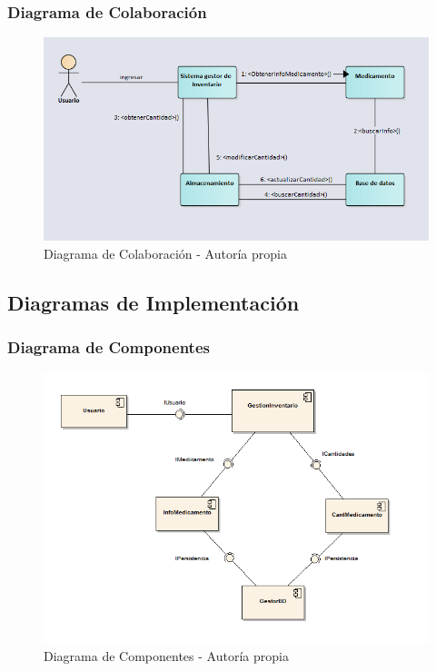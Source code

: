 \newpage


\subsubsection{ Diagrama de Colaboración}
\begin{center}
    \begin{figure}[htb]
        \centering
        \includegraphics[width = 1.2\linewidth] {libro/capitulo5/img/Colaboracion.PNG}
        \caption{Diagrama de Colaboración - Autor\'ia propia}
        \label{fig:my_label}
    \end{figure}
\end{center}
\newpage

\subsection{ Diagramas de Implementación}
\subsubsection{ Diagrama de Componentes}
\begin{center}
    \begin{figure}[htb]
        \centering
        \includegraphics[width = 0.8\linewidth] {libro/capitulo5/img/Componentes.png}
        \caption{Diagrama de Componentes - Autor\'ia propia}
        \label{fig:my_label}
    \end{figure}
\end{center}
